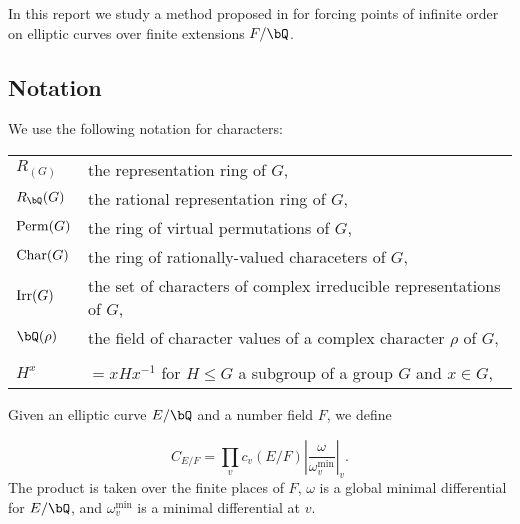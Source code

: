 In this report we study a method proposed in \cite{DEW1} for forcing points of infinite order on elliptic curves over finite extensions $F / \bQ$. 








\subsection*{Notation}
We use the following notation for characters:

\bigskip

\begin{tabular}{l | l}
    $R_(G)$ & the representation ring of $G$, \\
    $R_{\bQ}(G)$ & the rational representation ring of $G$, \\
    $\mathrm{Perm}(G)$ & the ring of virtual permutations of $G$, \\
    $\mathrm{Char}(G)$ & the ring of rationally-valued characeters of $G$,\\
    $\mathrm{Irr}(G)$ & the set of characters of complex irreducible representations of $G$, \\
    $\bQ(\rho)$ & the field of character values of a complex character $\rho$ of $G$, \\
    \\
    $H^{x}$ & $= xHx^{-1}$  for $H \leq G$ a subgroup of a group $G$ and $x \in G$,
\end{tabular}
\vspace{2em}

Given an elliptic curve $E / \bQ$ and a number field $F$, we define

\[ C_{E / F} = \prod_v c_v(E / F) \left| \frac{\omega}{\omega_v^{\min}} \right|_v. \]
The product is taken over the finite places of $F$, $\omega$ is a global minimal differential for $E / \bQ$, and $\omega_v^{\min}$ is a minimal differential at $v$.